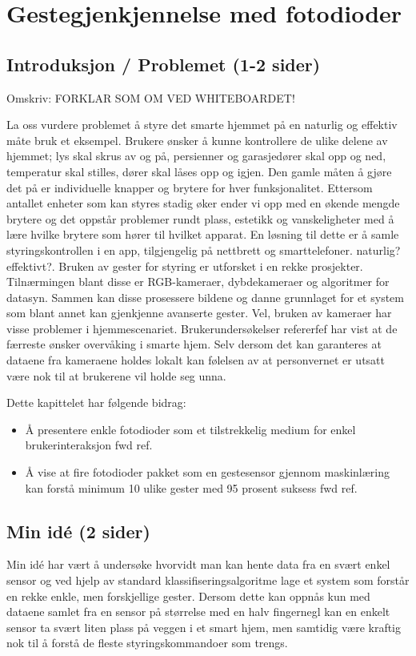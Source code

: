 \section{Gestegjenkjennelse med fotodioder}
\subsection{Introduksjon / Problemet (1-2 sider)}
{\color{red} Omskriv: FORKLAR SOM OM VED WHITEBOARDET!}

La oss vurdere problemet å styre det smarte hjemmet på en naturlig og effektiv måte {\color{red} bruk et eksempel}. Brukere ønsker å kunne kontrollere de ulike delene av hjemmet; lys skal skrus av og på, persienner og garasjedører skal opp og ned, temperatur skal stilles, dører skal låses opp og igjen. Den gamle måten å gjøre det på er individuelle knapper og brytere for hver funksjonalitet. Ettersom antallet enheter som kan styres stadig øker ender vi opp med en økende mengde brytere og det oppstår problemer rundt plass, estetikk og vanskeligheter med å lære hvilke brytere som hører til hvilket apparat. En løsning til dette er å samle styringskontrollen i en app, tilgjengelig på nettbrett og smarttelefoner. {\color{red} naturlig? effektivt?}. Bruken av gester for styring er utforsket i en rekke prosjekter. Tilnærmingen blant disse er RGB-kameraer, dybdekameraer og algoritmer for datasyn. Sammen kan disse prosessere bildene og danne grunnlaget for et system som blant annet kan gjenkjenne avanserte gester. Vel, bruken av kameraer har visse problemer i hjemmescenariet. Brukerundersøkelser {\color{red} refererfef} har vist at de færreste ønsker overvåking i smarte hjem. Selv dersom det kan garanteres at dataene fra kameraene holdes lokalt kan følelsen av at personvernet er utsatt være nok til at brukerene vil holde seg unna.

Dette kapittelet har følgende bidrag:
\begin{itemize}
\item Å presentere enkle fotodioder som et tilstrekkelig medium for enkel brukerinteraksjon {\color{red} fwd ref}.
\item Å vise at fire fotodioder pakket som en gestesensor gjennom maskinlæring kan forstå minimum 10 ulike gester med 95 prosent suksess {\color{red} fwd ref}.
\end{itemize}

\subsection{Min idé (2 sider)}
Min idé har vært å undersøke hvorvidt man kan hente data fra en svært enkel sensor og ved hjelp av standard klassifiseringsalgoritme lage et system som forstår en rekke enkle, men forskjellige gester. Dersom dette kan oppnås kun med dataene samlet fra en sensor på størrelse med en halv fingernegl kan en enkelt sensor ta svært liten plass på veggen i et smart hjem, men samtidig være kraftig nok til å forstå de fleste styringskommandoer som trengs. 

